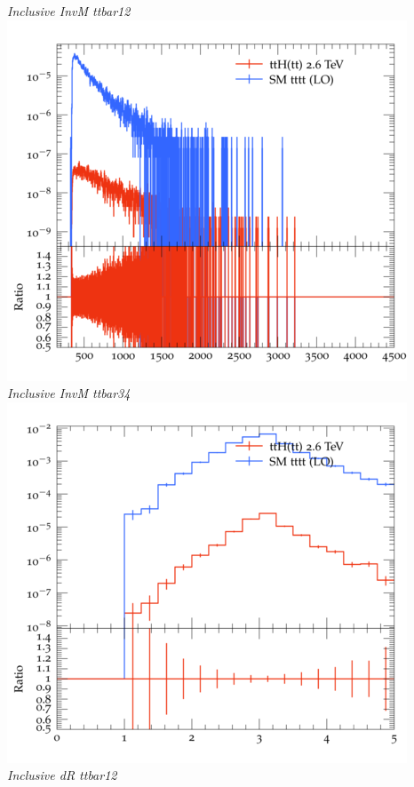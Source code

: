 \documentclass{beamer}
\begin{document}
\begin{frame}
\begin{columns}
\textit{\small Inclusive InvM ttbar12}
\includegraphics[width=\textwidth]{../plots/ttH_2600/tttt_ttH/Inclusive_InvM_ttbar34.png}\\
\textit{\small Inclusive InvM ttbar34}
\includegraphics[width=\textwidth]{../plots/ttH_2600/tttt_ttH/Inclusive_dR_ttbar12.png}\\
\textit{\small Inclusive dR ttbar12}
\end{columns}
\end{frame}
\end{document}
